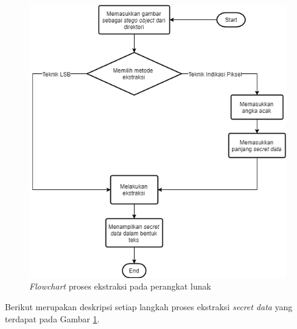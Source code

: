 \documentclass[a4paper,twoside]{article}
\begin{document}
\begin{enumerate}
		\begin{figure}[!htbp]
		\centering
		\includegraphics[scale=0.5]{Reconstruct.png}
		\caption{\textit{Flowchart} proses ekstraksi pada perangkat lunak}
		\label{imageRecons}
		\end{figure}
		
		Berikut merupakan deskripsi setiap langkah proses ekstraksi \textit{secret data} yang terdapat pada Gambar \ref{imageRecons}.
		

\end{enumerate}
\end{document}
